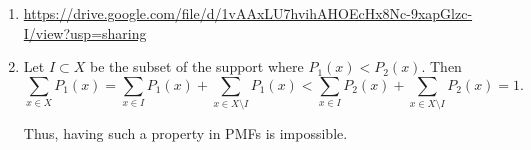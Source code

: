 \begin{enumerate}[label=(\alph*)]
\item \url{https://drive.google.com/file/d/1vAAxLU7hvihAHOEcHx8Nc-9xapGlzc-I/view?usp=sharing}

\item Let $I \subset X$ be the subset of the support where $P_{1}(x) < P_{2}
(x)$. Then $$\sum_{x \in X} P_{1}(x) = \sum_{x \in I}P_{1}(x) + \sum_{x \in
X \setminus I}P_{1}(x) < \sum_{x \in I}P_{2}(x) + \sum_{x \in
X \setminus I}P_{2}(x) = 1.$$

Thus, having such a property in PMFs is impossible.

\end{enumerate}